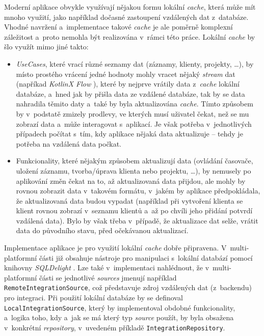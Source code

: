 Moderní aplikace obvykle využívají nějakou formu lokální \emph{cache}, která může mít mnoho využití, jako například dočasné zastoupení vzdálených dat z~databáze. Vhodné navržení a~implementace takové \emph{cache} je ale poměrně komplexní záležitost a~proto nemohla být realizována v~rámci této práce. Lokální \emph{cache} by šlo využít mimo jiné takto:
\begin{itemize}
\item{\emph{UseCases}, které vrací různé seznamy dat (záznamy, klienty, projekty, \dots), by místo prostého vrácení jedné hodnoty mohly vracet nějaký \emph{stream} dat (napříkad \emph{KotlinX Flow} \cite{kotlinx-flow}), které by nejprve vrátily data z~\emph{cache} lokální databáze, a~hned jak by přišla data ze vzdálené databáze, tak by se data nahradila těmito daty a~také by byla aktualizována \emph{cache}. Tímto způsobem by v~podstatě zmizely prodlevy, ve kterých musí uživatel čekat, než se mu zobrazí data a~může interagovat s~aplikací. Je však potřeba v~jednotlivých případech počítat s~tím, kdy aplikace nějaká data aktualizuje – tehdy je potřeba na vzdálená data počkat.}
\item{Funkcionality, které nějakým způsobem aktualizují data (ovládání časovače, uložení záznamu, tvorba/úprava klienta nebo projektu, \dots), by nemusely po aplikování změn čekat na to, až aktualizovaná data přijdou, ale mohly by rovnou zobrazit data v~takovém formátu, v~jakém by aplikace předpokládala, že aktualizovaná data budou vypadat (například při vytvoření klienta se klient rovnou zobrazí v~seznamu klientů a~až po chvíli jeho přidání potvrdí vzdálená data). Bylo by však třeba v~případě, že aktualizace dat selže, vrátit data do původního stavu, před očekávanou aktualizací.}
\end{itemize}

Implementace aplikace je pro využití lokální \emph{cache} dobře připravena. V~multi-platformní části již obsahuje nástroje pro manipulaci s~lokální databází pomocí knihovny \emph{SQLDelight} \cite{sqldelight}. Lze také v~implementaci nahlédnout, že v~multi-platformní části se jednotlivé \emph{sources} jmenují například \texttt{RemoteIntegrationSource}, což představuje zdroj vzdálených dat (z~backendu) pro integraci. Při použití lokální databáze by se definoval \texttt{LocalIntegrationSource}, který by implementoval obdobné funkcionality, a~logika toho, kdy a~jak se má který typ \emph{source} použít, by byla obsažena v~konkrétní \emph{repository}, v~uvedeném příkladě \texttt{IntegrationRepository}.

